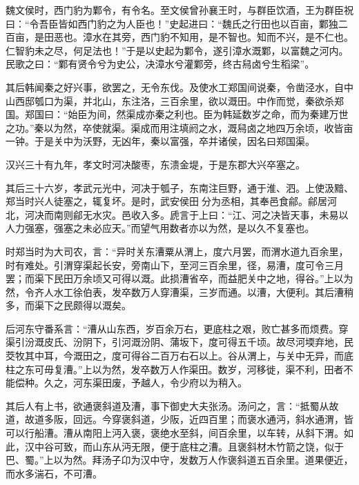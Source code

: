 \documentclass[12pt,UTF8]{ctexbook}
\begin{document}
魏文侯时，西门豹为鄴令，有令名。至文侯曾孙襄王时，与群臣饮酒，王为群臣祝曰：“令吾臣皆如西门豹之为人臣也！”史起进曰：“魏氏之行田也以百亩，鄴独二百亩，是田恶也。漳水在其旁，西门豹不知用，是不智也。知而不兴，是不仁也。仁智豹未之尽，何足法也！”于是以史起为鄴令，遂引漳水溉鄴，以富魏之河内。民歌之曰：“鄴有贤令兮为史公，决漳水兮灌鄴旁，终古舄卤兮生稻梁”。



其后韩闻秦之好兴事，欲罢之，无令东伐。及使水工郑国间说秦，令凿泾水，自中山西邸瓠口为渠，并北山，东注洛，三百余里，欲以溉田。中作而觉，秦欲杀郑国。郑国曰：“始臣为间，然渠成亦秦之利也。臣为韩延数岁之命，而为秦建万世之功。”秦以为然，卒使就渠。渠成而用注填阏之水，溉舄卤之地四万余顷，收皆亩一钟。于是关中为沃野，无凶年，秦以富强，卒并诸侯，因名曰郑国渠。



汉兴三十有九年，孝文时河决酸枣，东溃金堤，于是东郡大兴卒塞之。



其后三十六岁，孝武元光中，河决于瓠子，东南注巨野，通于淮、泗。上使汲黯、郑当时兴人徒塞之，辄复坏。是时，武安侯田分为丞相，其奉邑食鄃。鄃居河北，河决而南则鄃无水灾。邑收入多。虒言于上曰：“江、河之决皆天事，未易以人力强塞，强塞之未必应天。”而望气用数者亦以为然，是以久不复塞也。



时郑当时为大司农，言：“异时关东漕粟从渭上，度六月罢，而渭水道九百余里，时有难处。引渭穿渠起长安，旁南山下，至河三百余里，径，易漕，度可令三月罢；而渠下民田万余顷又可得以溉。此损漕省卒，而益肥关中之地，得谷。”上以为然，令齐人水工徐伯表，发卒数万人穿漕渠，三岁而通。以漕，大便利。其后漕稍多，而渠下之民颇得以溉矣。



后河东守番系言：“漕从山东西，岁百余万右，更底柱之艰，败亡甚多而烦费。穿渠引汾溉皮氏、汾阴下，引河溉汾阴、蒲坂下，度可得五千顷。故尽河堧弃地，民茭牧其中耳，今溉田之，度可得谷二百万右石以上。谷从渭上，与关中无异，而底柱之东可毋复漕。”上以为然，发卒数万人作渠田。数岁，河移徙，渠不利，田者不能偿种。久之，河东渠田废，予越人，令少府以为稍入。



其后人有上书，欲通褒斜道及漕，事下御史大夫张汤。汤问之，言：“抵蜀从故道，故道多阪，回远。今穿褒斜道，少阪，近四百里；而褒水通沔，斜水通渭，皆可以行船漕。漕从南阳上沔入褒，褒绝水至斜，间百余里，以车转，从斜下渭。如此，汉中谷可致，而山东从沔无限，便于底柱之漕。且褒斜材木竹箭之饶，似于巴、蜀。”上以为然。拜汤子卬为汉中守，发数万人作褒斜道五百余里。道果便近，而水多湍石，不可漕。
\end{document}
